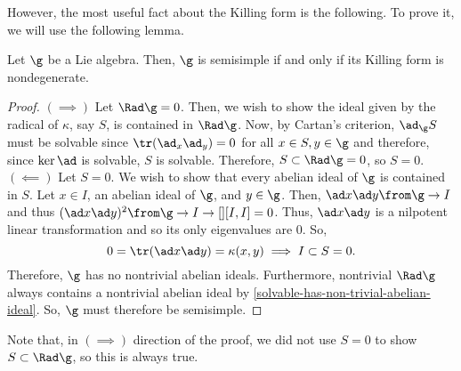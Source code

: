 \documentclass[11pt,leqno,oneside]{amsart}
\numberwithin{thm}{section}
\begin{document}
However, the most useful fact about the Killing form is the
following. To prove it, we will use the following lemma.
\begin{thm}\label{cartan-semisimplicity-criterion}
  Let \(\g\) be a Lie algebra. Then, \(\g\) is semisimple if and only
  if its Killing form is nondegenerate. 
\end{thm}
\begin{proof}
  \((\implies)\) Let \(\Rad \g = 0\). Then, we wish to show the ideal
  given by the radical of \(\kappa\), say \(S\), is contained in
  \(\Rad \g\). Now, by Cartan's criterion, \(\ad_\g S\) must be
  solvable since \(\tr(\ad_x \ad_y) = 0\) for all \(x \in S, y \in
  \g\) and therefore, since \(\ker \ad\) is solvable, \(S\) is
  solvable. Therefore, \(S \subset \Rad \g = 0\), so \(S = 0\). \\

  \((\impliedby)\) Let \(S = 0\). We wish to show that every abelian
  ideal of \(\g\) is contained in \(S\). Let \(x \in I\), an abelian
  ideal of \(\g\), and \(y \in \g\). Then, \(\ad x \ad y \from \g \to
  I\) and thus \((\ad 
  x \ad y)^2 \from \g \to I \to[] [I,I] = 0\). Thus, \(\ad x \ad y\) is
  a nilpotent linear transformation and so its only eigenvalues are
  0. So, \[
    0 = \tr(\ad x \ad y) = \kappa(x,y) \implies I \subset S = 0.
  \]
  Therefore, \(\g\) has no nontrivial abelian ideals. Furthermore,
  nontrivial \(\Rad \g\) 
  always contains a nontrivial abelian ideal by
  \ref{solvable-has-non-trivial-abelian-ideal}. So, \(\g\) must
  therefore be semisimple. 
\end{proof}
\begin{rmk}
  Note that, in \((\implies)\) direction of the proof, we did not use
  \(S = 0\) to show \(S \subset \Rad \g\), so this is always true.
\end{rmk}
\end{document}
